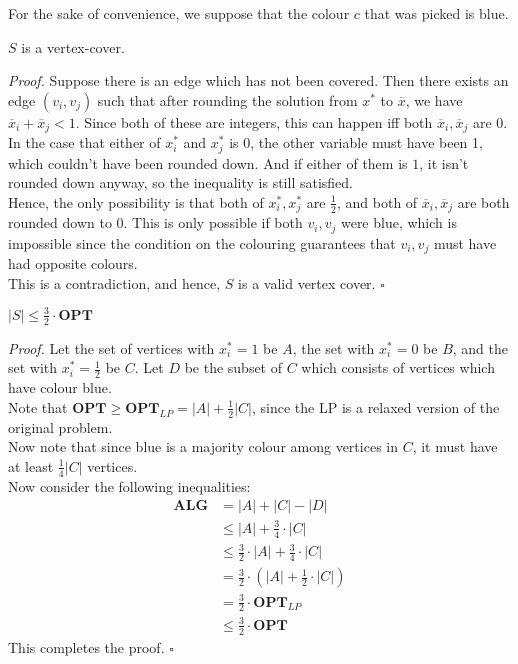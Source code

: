\documentclass[a4paper]{article}
\newenvironment{proof}{\begin{breakbox}\textit{Proof.}}{\hfill$\square$\end{breakbox}}
\newcommand{\nl}{\vspace{0.2cm}\\}
\newcommand{\OPT}{\mathbf{OPT}}
\newcommand{\ALG}{\mathbf{ALG}}
\begin{document}
For the sake of convenience, we suppose that the colour $c$ that was picked is blue.\nl

\begin{claim}
    $S$ is a vertex-cover.
\end{claim}

\begin{proof}
    Suppose there is an edge which has not been covered. Then there exists an edge $(v_i, v_j)$ such that after rounding the solution from $x^*$ to $\overline{x}$, we have $\overline{x}_i +
    \overline{x}_j
    < 1$. Since both of these are integers, this can happen iff both $\overline{x}_i, \overline{x}_j$ are 0. In the case that either of $x^*_i$ and $x^*_j$ is $0$, the other variable must have been
    1, which couldn't have been rounded down. And if either of them is $1$, it isn't rounded down anyway, so the inequality is still satisfied.\nl
    Hence, the only possibility is that both of $x^*_i, x^*_j$ are $\frac{1}{2}$, and both of $\overline{x}_i, \overline{x}_j$ are both rounded down to $0$. This is only possible if both $v_i,
    v_j$
    were blue, which is impossible since the condition on the colouring guarantees that $v_i, v_j$ must have had opposite colours.\nl
    This is a contradiction, and hence, $S$ is a valid vertex cover.
\end{proof}

\begin{claim}
    $|S| \le \frac{3}{2} \cdot \OPT$
\end{claim}

\begin{proof}
    Let the set of vertices with $x_i^* = 1$ be $A$, the set with $x_i^* = 0$ be $B$, and the set with $x_i^* = \frac{1}{2}$ be $C$. Let $D$ be the subset of $C$ which consists of vertices
    which have colour blue.\nl
    Note that $\OPT \ge \OPT_{LP} = |A| + \frac{1}{2} |C|$, since the LP is a relaxed version of the original problem.\nl
    Now note that since blue is a majority colour among vertices in $C$, it must have at least $\frac{1}{4} |C|$ vertices.\nl
    Now consider the following inequalities:\nl
    \begin{align*}
        \ALG &= |A| + |C| - |D|\\
             &\le |A| + \frac{3}{4} \cdot |C|\\
             &\le \frac{3}{2} \cdot |A| + \frac{3}{4} \cdot |C|\\
             &= \frac{3}{2} \cdot \left(|A| + \frac{1}{2} \cdot |C|\right)\\
             &= \frac{3}{2} \cdot \OPT_{LP}\\
             &\le \frac{3}{2} \cdot \OPT
    \end{align*}
    This completes the proof.
\end{proof}
\end{document}
